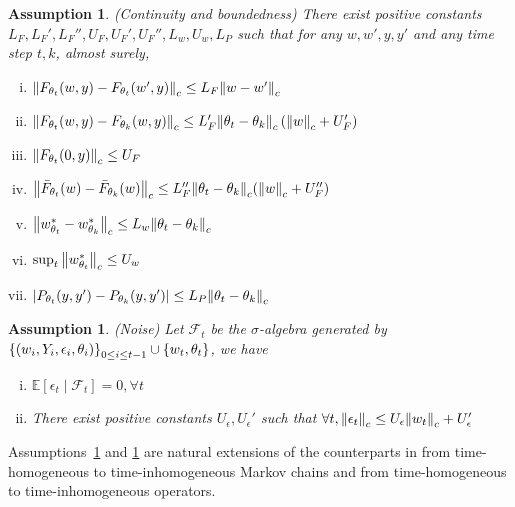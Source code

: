 \documentclass[twoside,11pt]{article}
\newcommand{\fF}{\mathcal{F}}
\newcommand{\E}{\mathbb{E}}
\newcounter{assucounter}
\numberwithin{assucounter}{section}
\newtheorem{assumption}[assucounter]{Assumption}
\begin{document}
\begin{assumption}
    \label{assu regularization}
(Continuity and boundedness)
There exist positive constants \\$L_F, L_F', L_F'', U_F, U_F', U_F'', L_w, U_w, L_P$ such that for any $w, w', y, y'$ and any time step $t, k$, almost surely,
\begin{enumerate}[(i).]
    \item $\norm{F_{\theta_t}(w, y) - F_{\theta_t}(w', y)}_c \leq L_F \norm{w - w'}_c$ 
    \item $\norm{F_{\theta_t}(w, y) - F_{\theta_k}(w, y)}_c \leq L_F' \norm{\theta_t - \theta_k}_c \left(\norm{w}_c + U_F'\right)$
    \item $\norm{F_{\theta_t}(0, y)}_c \leq U_F$
    \item $\norm{\bar F_{\theta_t}(w) - \bar F_{\theta_k}(w)}_c \leq L_F'' \norm{\theta_t - \theta_k}_c (\norm{w}_c + U_F'')$ 
    \item $\norm{w^*_{\theta_t} - w^*_{\theta_k}}_c \leq L_w \norm{\theta_t - \theta_k}_c$ 
    \item $\sup_{t} \norm{w^*_{\theta_t}}_c \leq U_w $
    \item $\abs{ P_{\theta_t}(y, y') - P_{\theta_k}(y, y') } \leq L_P \norm{\theta_t - \theta_k}_c$
\end{enumerate}
\end{assumption}
\begin{assumption}
  \label{assu mds}
  (Noise)
  Let $\fF_t$ be the $\sigma$-algebra generated by \\$\qty{(w_i, Y_i, \epsilon_i, \theta_i)}_{0 \leq i \leq t-1} \cup \qty{w_t, \theta_t}$, we have
  \begin{enumerate}[(i).]
    \item $\E\left[\epsilon_t \mid \fF_t\right] = 0, \forall t$
    \item There exist positive constants $U_\epsilon, U_\epsilon'$ such that $\forall t, \norm{\epsilon_t}_c \leq U_\epsilon \norm{w_t}_c + U_\epsilon'$
  \end{enumerate}
\end{assumption}
Assumptions~\ref{assu regularization} and \ref{assu mds} are natural extensions of the counterparts in \citet{chen2021lyapunov} from time-homogeneous to time-inhomogeneous Markov chains and
from time-homogeneous to time-inhomogeneous operators.
\end{document}
